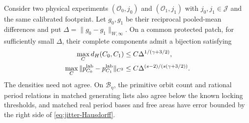 \begin{proposition}
\label{prop:jitter-modulus}
Consider two physical experiments $(\mathcal O_0,j_0)$ and
$(\mathcal O_1,j_1)$ with $j_0,j_1\in\mathcal J$ and the same calibrated
footprint. Let $g_0,g_1$ be their reciprocal pooled-mean differences and
put $\Delta=\|g_0-g_1\|_{W,\infty}$. On a common protected patch,
for sufficiently small $\Delta$, their complete components admit a
bijection satisfying
\begin{align}
 \max_C d_H(C_0,C_1)&\le C\Delta^{1/(\gamma+3/2)},
                                      \label{eq:jitter-Hausdorff}\\
 \max_C\|p_{C_0}^{\rm lab}-p_{C_1}^{\rm lab}\|_{C^2}
    &\le C\Delta^{(s-2)/(s(\gamma+3/2))}.
                                      \label{eq:jitter-modulus}
\end{align}
The densities need not agree. On $\mathcal B_\eta$, the primitive
orbit count and rational period relations in matched generating lists
also agree below the known
locking thresholds, and matched real period bases and free areas
have error bounded by the right side of \eqref{eq:jitter-Hausdorff}.
\end{proposition}

